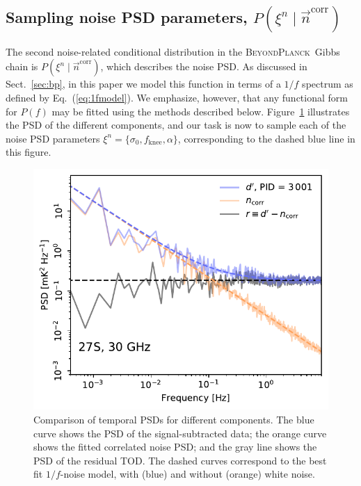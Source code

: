 \documentclass[twocolumn]{aa}
\newcommand{\BP}{\textsc{BeyondPlanck}}
\begin{document}
\subsection{Sampling noise PSD parameters, $P(\xi^n\mid\vec{n}^\mathrm{corr})$}
\label{sec:noise_psd}

The second noise-related conditional distribution in the \BP\ Gibbs
chain is $P(\xi^n\mid\vec{n}^\mathrm{corr})$, which describes the
noise PSD. As discussed in Sect.~\ref{sec:bp}, in this paper we model
this function in terms of a $1/f$ spectrum as defined by
Eq.~(\ref{eq:1fmodel}). 
We emphasize, however, that any functional form for $P(f)$ may be
fitted using the methods described below. Figure~\ref{fig:ps_1f}
illustrates the PSD of the different components, and our task is now
to sample each of the noise PSD parameters $\xi^n = \{\sigma_0,
f_\mathrm{knee}, \alpha\}$, corresponding to the dashed blue line in
this figure.

\begin{figure}
	\begin{center}
		\includegraphics[width=\linewidth]{figs/ps_running_mean_27S.pdf}
	\end{center}
	\caption{Comparison of temporal PSDs for different
          components. The blue curve shows the PSD of the
          signal-subtracted data; the orange curve shows the fitted
          correlated noise PSD; and the gray line shows the PSD of the
          residual TOD. The dashed curves correspond to the best fit
          $1/f$-noise model, with (blue) and without (orange) white
          noise.}
	\label{fig:ps_1f}
\end{figure}
\end{document}
